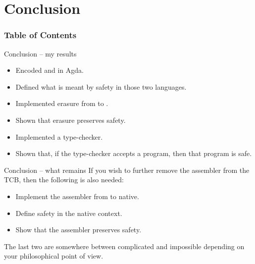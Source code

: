 \section{Conclusion}
\begin{frame}
\frametitle{Table of Contents}
\tableofcontents[currentsection]
\end{frame}

\begin{frame}{Conclusion -- my results}
  \begin{itemize}
  \pause\item Encoded \ATAL and \ATALe in Agda.
  \pause\item Defined what is meant by safety in those two languages.
  \pause\item Implemented erasure from \ATAL to \ATALe.
  \pause\item Shown that erasure preserves safety.
  \pause\item Implemented a type-checker.
  \pause\item Shown that, if the type-checker accepts a program, then that
  program is safe.
  \end{itemize}
\end{frame}

\begin{frame}{Conclusion -- what remains}
  If you wish to further remove the assembler from the TCB, then the following
  is also needed:

  \begin{itemize}
  \item Implement the assembler from \ATALe to native.
  \item Define safety in the native context.
  \item Show that the assembler preserves safety.
  \end{itemize}

  \pause The last two are somewhere between complicated and impossible depending
  on your philosophical point of view.
\end{frame}
